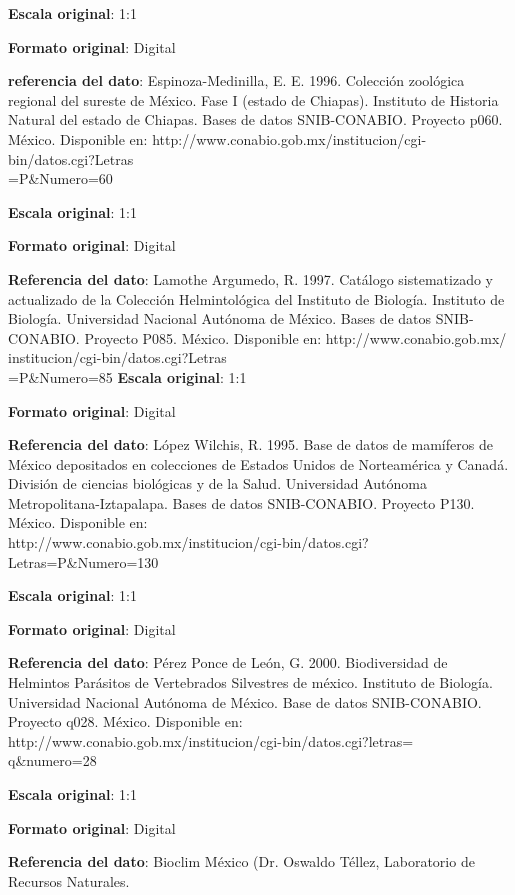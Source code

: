 \documentclass[twoside]{book}
\begin{document}
{\textbf{Escala original}: 1:1

\textbf{Formato original}: Digital

\textbf{referencia del dato}: Espinoza-Medinilla, E. E. 1996. Colección zoológica regional del sureste de México. Fase I (estado de Chiapas). Instituto de Historia Natural del estado de Chiapas. Bases de datos SNIB-CONABIO. Proyecto p060. México. Disponible en: http://www.conabio.gob.mx/institucion/cgi-bin/datos.cgi?Letras\\=P\&Numero=60

\textbf{Escala original}: 1:1

\textbf{Formato original}: Digital

\textbf{Referencia del dato}: Lamothe Argumedo, R. 1997. Catálogo sistematizado y actualizado de la Colección Helmintológica del Instituto de Biología. Instituto de Biología. Universidad Nacional Autónoma de México. Bases de datos SNIB-CONABIO. Proyecto P085. México. Disponible en: http://www.conabio.gob.mx/\\institucion/cgi-bin/datos.cgi?Letras\\=P\&Numero=85
\textbf{Escala original}: 1:1

\textbf{Formato original}: Digital

\textbf{Referencia del dato}: López Wilchis, R. 1995. Base de datos de mamíferos de México depositados en colecciones de Estados Unidos de Norteamérica y Canadá. División de ciencias biológicas y de la Salud. Universidad Autónoma Metropolitana-Iztapalapa. Bases de datos SNIB-CONABIO. Proyecto P130. México. Disponible en: \\http://www.conabio.gob.mx/institucion/cgi-bin/datos.cgi?\\Letras=P\&Numero=130

\textbf{Escala original}: 1:1

\textbf{Formato original}: Digital

\textbf{Referencia del dato}: Pérez Ponce de León, G. 2000. Biodiversidad de Helmintos Parásitos de Vertebrados Silvestres de méxico. Instituto de Biología. Universidad Nacional Autónoma de México. Base de datos SNIB-CONABIO. Proyecto q028. México. Disponible en: http://www.conabio.gob.mx/institucion/cgi-bin/datos.cgi?letras=\\q\&numero=28

\textbf{Escala original}: 1:1

\textbf{Formato original}: Digital

\textbf{Referencia del dato}: Bioclim México (Dr. Oswaldo Téllez, Laboratorio de Recursos Naturales.

}
\end{document}
